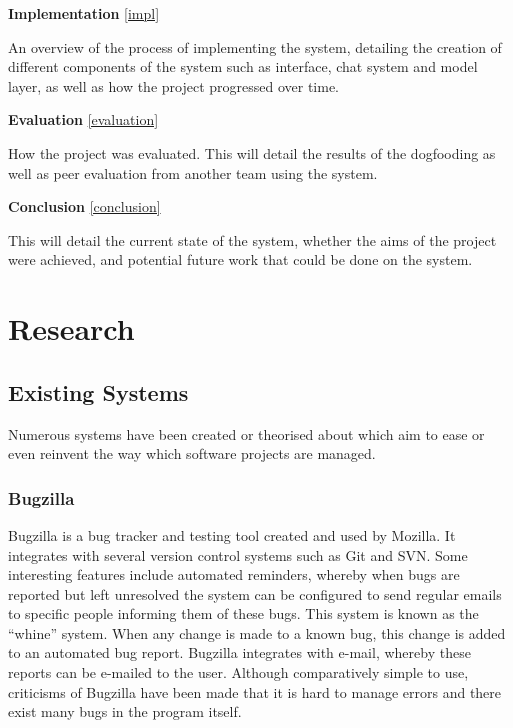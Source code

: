 \documentclass[a4paper]{l3proj}
\begin{document}
\textbf{Implementation} \autoref{impl}

An overview of the process of implementing the system, detailing the creation of different components of the system such as interface, chat system and model layer, as well as how the project progressed over time.

\textbf{Evaluation} \autoref{evaluation}

How the project was evaluated.  This will detail the results of the dogfooding as well as peer evaluation from another team using the system.

\textbf{Conclusion} \autoref{conclusion}

This will detail the current state of the system, whether the aims of the project were achieved, and potential future work that could be done on the system.


\chapter{Research}
\label{research}
\section{Existing Systems}
\label{existingSystems}

Numerous systems have been created or theorised about which aim to ease or even reinvent the way which software projects are managed.


\subsection{Bugzilla}
\label{bugzilla}

Bugzilla is a bug tracker and testing tool created and used by Mozilla. It integrates with several version control systems such as Git and SVN.  Some interesting features include automated reminders, whereby when bugs are reported but left unresolved the system can be configured to send regular emails to specific people informing them of these bugs. This system is known as the ``whine'' system.  When any change is made to a known bug, this change is added to an automated bug report.  Bugzilla integrates with e-mail, whereby these reports can be e-mailed to the user. Although comparatively simple to use, criticisms of Bugzilla have been made that it is hard to manage errors and there exist many bugs in the program itself.
\end{document}
